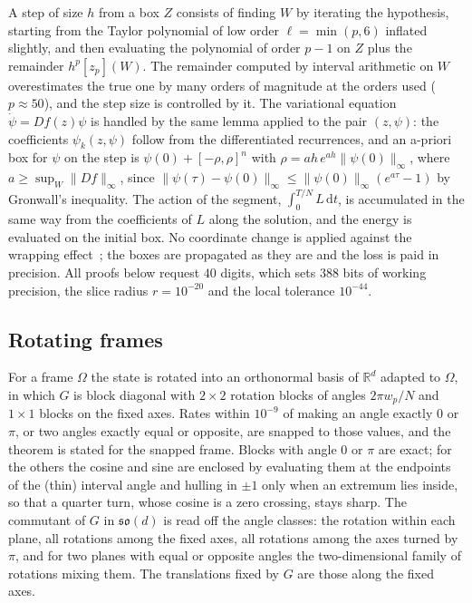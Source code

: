 \documentclass[11pt]{amsart}
\theoremstyle{definition}
\newcommand{\R}{\mathbb{R}}
\newcommand{\so}{\mathfrak{so}}
\newcommand{\dd}{\,\mathrm{d}}
\newcommand{\intv}[1]{[#1]}
\begin{document}
A step of size $h$ from a box $Z$ consists of finding $W$ by iterating the hypothesis, starting from the Taylor polynomial of low order $\ell=\min(p,6)$ inflated slightly, and then evaluating the polynomial of order $p-1$ on $Z$ plus the remainder $h^p\intv{z_p}(W)$. The remainder computed by interval arithmetic on $W$ overestimates the true one by many orders of magnitude at the orders used ($p\approx50$), and the step size is controlled by it. The variational equation $\dot\psi=Df(z)\psi$ is handled by the same lemma applied to the pair $(z,\psi)$: the coefficients $\psi_k(z,\psi)$ follow from the differentiated recurrences, and an a-priori box for $\psi$ on the step is $\psi(0)+[-\rho,\rho]^n$ with $\rho=ah\,e^{ah}\|\psi(0)\|_\infty$, where $a\ge\sup_W\|Df\|_\infty$, since $\|\psi(\tau)-\psi(0)\|_\infty\le\|\psi(0)\|_\infty(e^{a\tau}-1)$ by Gronwall's inequality. The action of the segment, $\int_0^{T/N}L\dd t$, is accumulated in the same way from the coefficients of $L$ along the solution, and the energy is evaluated on the initial box. No coordinate change is applied against the wrapping effect~\cite{Lohner1987,Zgliczynski2002}; the boxes are propagated as they are and the loss is paid in precision. All proofs below request $40$ digits, which sets $388$ bits of working precision, the slice radius $r=10^{-20}$ and the local tolerance $10^{-44}$.

\subsection{Rotating frames}
For a frame $\Omega$ the state is rotated into an orthonormal basis of $\R^d$ adapted to $\Omega$, in which $G$ is block diagonal with $2\times2$ rotation blocks of angles $2\pi w_p/N$ and $1\times1$ blocks on the fixed axes. Rates within $10^{-9}$ of making an angle exactly $0$ or $\pi$, or two angles exactly equal or opposite, are snapped to those values, and the theorem is stated for the snapped frame. Blocks with angle $0$ or $\pi$ are exact; for the others the cosine and sine are enclosed by evaluating them at the endpoints of the (thin) interval angle and hulling in $\pm1$ only when an extremum lies inside, so that a quarter turn, whose cosine is a zero crossing, stays sharp. The commutant of $G$ in $\so(d)$ is read off the angle classes: the rotation within each plane, all rotations among the fixed axes, all rotations among the axes turned by $\pi$, and for two planes with equal or opposite angles the two-dimensional family of rotations mixing them. The translations fixed by $G$ are those along the fixed axes.
\end{document}
